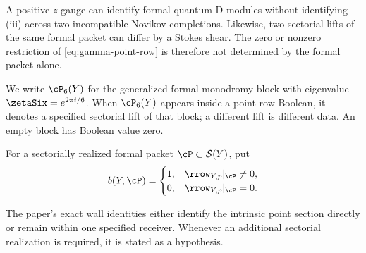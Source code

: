 A positive-\(z\) gauge can identify formal quantum D-modules without
identifying (iii) across two incompatible Novikov completions.  Likewise,
two sectorial lifts of the same formal packet can differ by a Stokes shear.
The zero or nonzero restriction of \eqref{eq:gamma-point-row} is therefore
not determined by the
formal packet alone.

We write \(\cP_6(Y)\) for the generalized formal-monodromy block with
eigenvalue \(\zetaSix=e^{2\pi i/6}\).  When \(\cP_6(Y)\) appears inside a
point-row Boolean, it denotes a specified sectorial lift of that block; a
different lift is different data.  An empty block has Boolean value zero.

\begin{definition}\label{def:boolean}
For a sectorially realized formal packet \(\cP\subset\mathcal S(Y)\), put
\begin{equation}\label{eq:point-row-boolean}
 b(Y,\cP)=
 \begin{cases}
 1,&\rrow_{Y,p}|_{\cP}\ne0,\\
 0,&\rrow_{Y,p}|_{\cP}=0.
 \end{cases}
\end{equation}
\end{definition}

The paper's exact wall identities either identify the intrinsic point
section directly or remain within one specified receiver.  Whenever an
additional sectorial realization is required, it is stated as a hypothesis.
